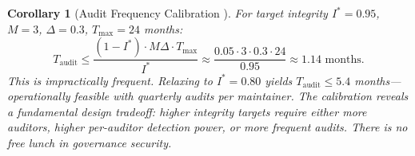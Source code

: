 \documentclass[12pt,a4paper]{article}
\newtheorem{corollary}[theorem]{Corollary}
\theoremstyle{definition}
\begin{document}
\begin{corollary}[Audit Frequency Calibration ]
\label{cor:audit_freq}
For target integrity $I^* = 0.95$, $M = 3$, $\Delta = 0.3$, $T_{\max} = 24$ months:
\begin{equation}
    T_{\text{audit}} \leq \frac{(1 - I^*) \cdot M \Delta \cdot T_{\max}}{I^*} \approx \frac{0.05 \cdot 3 \cdot 0.3 \cdot 24}{0.95} \approx 1.14 \text{ months}.
    \label{eq:audit_calib}
\end{equation}
This is impractically frequent. Relaxing to $I^* = 0.80$ yields $T_{\text{audit}} \leq 5.4$ months---operationally feasible with quarterly audits per maintainer. The calibration reveals a fundamental design tradeoff: higher integrity targets require either more auditors, higher per-auditor detection power, or more frequent audits. There is no free lunch in governance security.
\end{corollary}
\end{document}
